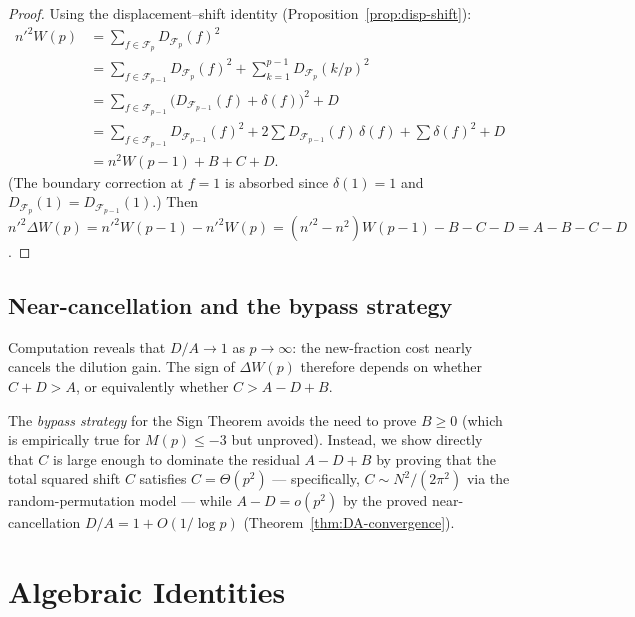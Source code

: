 \documentclass[11pt]{article}
\theoremstyle{definition}
\newcommand{\F}{\mathcal{F}}
\begin{document}
\begin{proof}
Using the displacement--shift identity (Proposition~\ref{prop:disp-shift}):
\begin{align*}
  n'^2 W(p) &= \sum_{f \in \F_p} D_{\F_p}(f)^2 \\
    &= \sum_{f \in \F_{p-1}} D_{\F_p}(f)^2 + \sum_{k=1}^{p-1} D_{\F_p}(k/p)^2 \\
    &= \sum_{f \in \F_{p-1}} \bigl(D_{\F_{p-1}}(f) + \delta(f)\bigr)^2 + D \\
    &= \sum_{f \in \F_{p-1}} D_{\F_{p-1}}(f)^2
      + 2\sum D_{\F_{p-1}}(f)\,\delta(f)
      + \sum \delta(f)^2 + D \\
    &= n^2 W(p-1) + B + C + D.
\end{align*}
(The boundary correction at $f = 1$ is absorbed since $\delta(1) = 1$
and $D_{\F_p}(1) = D_{\F_{p-1}}(1)$.)
Then $n'^2 \Delta W(p) = n'^2 W(p-1) - n'^2 W(p)
= (n'^2 - n^2) W(p-1) - B - C - D = A - B - C - D$.
\end{proof}

\subsection{Near-cancellation and the bypass strategy}\label{sec:bypass}

Computation reveals that $D/A \to 1$ as $p \to \infty$: the
new-fraction cost nearly cancels the dilution gain.  The sign of
$\Delta W(p)$ therefore depends on whether $C + D > A$, or
equivalently whether $C > A - D + B$.

The \emph{bypass strategy} for the Sign Theorem avoids the need to
prove $B \ge 0$ (which is empirically true for $M(p) \le -3$ but
unproved).  Instead, we show directly that $C$ is large enough to
dominate the residual $A - D + B$ by proving that the total squared
shift $C$ satisfies $C = \Theta(p^2)$ --- specifically,
$C \sim N^2/(2\pi^2)$ via the random-permutation model --- while
$A - D = o(p^2)$ by the proved near-cancellation
$D/A = 1 + O(1/\log p)$ (Theorem~\ref{thm:DA-convergence}).



\section{Algebraic Identities}\label{sec:identities}
\end{document}
